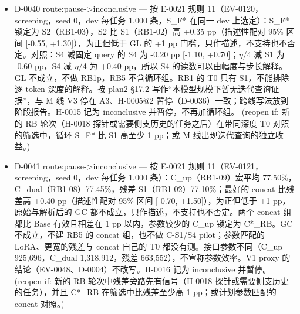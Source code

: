 \documentclass[11pt]{article}
\begin{document}
\begin{itemize}
\item D-0040 route:pause-\textgreater{}inconclusive --- 按 E-0021 规则 11（EV-0120，screening，seed 0，dev 每任务 1,000 条，S\_F* 在同一 dev 上选定）：S\_F* 锁定为 S2（RB1-03），S2 比 S1（RB1-02）高 +0.35 pp（描述性配对 95\% 区间 [-0.55, +1.30]），为正但低于 GL 的 +1 pp 门槛，只作描述，不支持也不否定。对照：S4 减固定 query 的 S4 为 -0.20 pp [-1.10, +0.70]；\ensuremath{\eta}/4 减 S1 为 -0.60 pp，S4 减 \ensuremath{\eta}/4 为 +0.40 pp，所以 S4 的读数可以由幅度与步长解释。GL 不成立，不做 RB1p，RB5 不含循环组。RB1 的 T0 只有 S1，不能排除逐 token 深度的解释。按 plan2 §17.2 写作``本模型规模下暂无迭代查询证据''，与 M 线 V3 停在 A3、H-0005@2 暂停（D-0036）一致；跨线写法放到阶段报告。H-0015 记为 inconclusive 并暂停，不再加循环组。 (reopen if: 新的 RB 轮次（H-0018 探针或需要侧支历史的任务之后）在带同深度 T0 对照的筛选中，循环 S\_F* 比 S1 高至少 1 pp；或 M 线出现迭代查询的独立收益。)
\item D-0041 route:pause-\textgreater{}inconclusive --- 按 E-0021 规则 11（EV-0121，screening，seed 0，dev 每任务 1,000 条）：C\_up（RB1-09）宏平均 77.50\%，C\_dual（RB1-08）77.45\%，残差 S1（RB1-02）77.10\%；最好的 concat 比残差高 +0.40 pp（描述性配对 95\% 区间 [-0.70, +1.50]），为正但低于 +1 pp，原始与解析后的 GC 都不成立，只作描述，不支持也不否定。两个 concat 组都比 Base 有效且相差在 1 pp 以内，参数较少的 C\_up 锁定为 C*\_RB。GC 不成立，不建 RB5 的 concat 组，也不做 C-S1/S4 pilot；参数匹配的 LoRA、更宽的残差与 concat 自己的 T0 都没有测。接口参数不同（C\_up 925,696，C\_dual 1,318,912，残差 663,552），不宣称参数效率。V1 proxy 的结论（EV-0048、D-0004）不改写。H-0016 记为 inconclusive 并暂停。 (reopen if: 新的 RB 轮次中残差旁路先有信号（H-0018 探针或需要侧支历史的任务），并且 C*\_RB 在筛选中比残差至少高 1 pp；或计划参数匹配的 concat 对照。)

\end{itemize}
\end{document}
